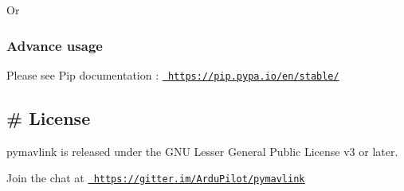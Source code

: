 Or 
\begin{DoxyCode}{0}
\end{DoxyCode}


\subsubsection*{Advance usage}

Please see Pip documentation \+: \href{https://pip.pypa.io/en/stable/}{\texttt{ https\+://pip.\+pypa.\+io/en/stable/}}

\subsection*{\# License }

pymavlink is released under the G\+NU Lesser General Public License v3 or later.

Join the chat at \href{https://gitter.im/ArduPilot/pymavlink}{\texttt{ https\+://gitter.\+im/\+Ardu\+Pilot/pymavlink}} 